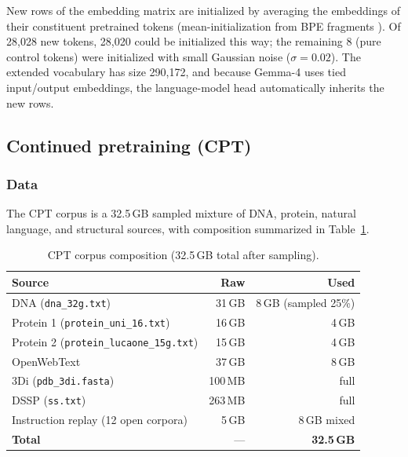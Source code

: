\documentclass[11pt]{article}
\begin{document}
New rows of the embedding matrix are initialized by averaging the embeddings of their constituent pretrained tokens (mean-initialization from BPE fragments \citep{kim2024vocabexpansion, tao2024lvm}). Of 28{,}028 new tokens, 28{,}020 could be initialized this way; the remaining 8 (pure control tokens) were initialized with small Gaussian noise ($\sigma = 0.02$). The extended vocabulary has size 290{,}172, and because Gemma-4 uses tied input/output embeddings, the language-model head automatically inherits the new rows.

\subsection{Continued pretraining (CPT)}

\subsubsection{Data}

The CPT corpus is a 32.5\,GB sampled mixture of DNA, protein, natural language, and structural sources, with composition summarized in Table~\ref{tab:cpt-data}.

\begin{table}[H]
\centering
\small
\caption{CPT corpus composition (32.5\,GB total after sampling).}
\label{tab:cpt-data}
\begin{tabular}{lrr}
\toprule
\textbf{Source} & \textbf{Raw} & \textbf{Used} \\
\midrule
DNA (\texttt{dna\_32g.txt})                   & 31\,GB  & 8\,GB (sampled 25\%) \\
Protein 1 (\texttt{protein\_uni\_16.txt})      & 16\,GB  & 4\,GB \\
Protein 2 (\texttt{protein\_lucaone\_15g.txt}) & 15\,GB  & 4\,GB \\
OpenWebText                                    & 37\,GB  & 8\,GB \\
3Di (\texttt{pdb\_3di.fasta})                  & 100\,MB & full \\
DSSP (\texttt{ss.txt})                         & 263\,MB & full \\
Instruction replay (12 open corpora)           &  5\,GB  & 8\,GB mixed \\
\midrule
\textbf{Total}                                 & ---     & \textbf{32.5\,GB} \\
\bottomrule
\end{tabular}
\end{table}
\end{document}
